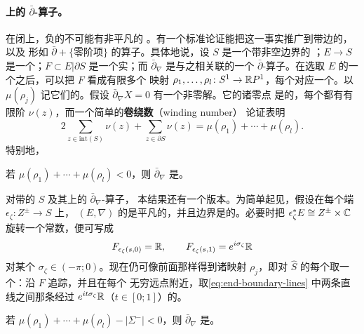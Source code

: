 \paragraph{\trLineBundle{}上的 \texorpdfstring{$\bar{\partial}$}{dbar}-算子。}%
\label{sub:n-operators-line-bundles}
在闭\trRiemann\trSurface{}上，负\trDegree{}的\trLineBundle{}不可能有非平凡的%
\trHolomorphic\trSection。有一个标准论证能把这一事实推广到带边的\trRiemann\trSurface，以及
形如 $\bar\partial+\{\text{零阶项}\}$ 的算子。具体地说，设 $S$ 是一个带非空边界的%
\trCompact\trConnected\trRiemann\trSurface；$E\to S$ 是一个\trHermitian\trLineBundle；$F\subset
E|\partial S$ 是一个实\trSubbundle；而 $\bar\partial_\nabla$ 是与之相关联的一个
$\bar\partial$-算子。在选取 $E$ 的一个\trTrivialization{}之后，可以把 $F$ 看成有限多个
映射 $\rho_1,\ldots,\rho_l\colon S^1\to\mathbb{R}P^1$，每个\trBoundaryComponent{}对应一个。以
$\mu(\rho_j)$ 记它们的\trDegree。假设 $\bar\partial_\nabla X=0$ 有一个非零解。它的诸零点
是\trIsolated{}的，每个都有有限阶 $\nu(z)$，而一个简单的\textbf{卷绕数}（winding number）
论证表明
\begin{equation}\label{eq:winding-number-count}
2\sum_{z\in\mathrm{int}(S)}\nu(z)+\sum_{z\in\partial S}\nu(z)
=\mu(\rho_1)+\cdots+\mu(\rho_l).
\end{equation}
特别地，
\begin{lemma}\label{thm:injective-negative-degree}
若 $\mu(\rho_1)+\cdots+\mu(\rho_l)<0$，则 $\bar\partial_\nabla$ 是\trInjective。
\noqed
\end{lemma}
对带\trStriplikeEnd{}的\trSurface{} $S$ 及其上的\trNondegenerate{} $\bar\partial_\nabla$-算子，
本结果还有一个版本。为简单起见，假设在每个端 $\epsilon_\zeta\colon Z^\pm\to S$ 上，
$(E,\nabla)$ 的\trPullback{}是平凡的，并且边界\trSubbundle{}是\trLocallyConstant{}的。必要时把%
\trTrivialization{} $\epsilon_\zeta^*E\cong Z^\pm\times\mathbb{C}$ 旋转一个常数，便可写成
\begin{equation}\label{eq:end-boundary-lines}
F_{\epsilon_\zeta(s,0)}=\mathbb{R},\qquad
F_{\epsilon_\zeta(s,1)}=e^{i\sigma_\zeta}\mathbb{R}
\end{equation}
对某个 $\sigma_\zeta\in(-\pi;0)$。现在仍可像前面那样得到诸映射 $\rho_j$，即对%
\trCompactification{} $\hat{S}$ 的每个\trBoundaryComponent{}取一个：沿 $F$ 追踪，并且在每个
无穷远点附近，取\eqref{eq:end-boundary-lines} 中两条直线之间那条经过
$e^{it\sigma_\zeta}\mathbb{R}$（$t\in[0;1]$）的\trHomotopy。
\begin{lemma}\label{thm:winding-injectivity}
若 $\mu(\rho_1)+\cdots+\mu(\rho_l)-|\Sigma^-|<0$，则 $\bar\partial_\nabla$ 是\trInjective。
\end{lemma}
